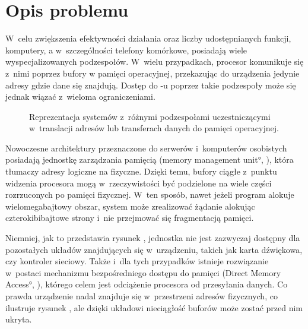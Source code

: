 \section{Opis problemu}

W~celu zwiększenia efektywności działania oraz liczby udostępnianych
funkcji, komputery, a w~szczególności telefony komórkowe, posiadają
wiele wyspecjalizowanych podzespołów.  W~wielu przypadkach, procesor
komunikuje się z~nimi poprzez bufory w pamięci operacyjnej,
przekazując do urządzenia jedynie adresy gdzie dane się znajdują.
Dostęp do -u poprzez takie podzespoły może się jednak wiązać
z~wieloma ograniczeniami.

\begin{figure}[tbp]
  \centering
   \qquad
  \qquad
  \caption[Różne przestrzenie adresowe dostępne
    w~komputerze.]{Reprezentacja systemów z~różnymi podzespołami
    uczestniczącymi w~translacji adresów lub transferach danych do
    pamięci operacyjnej.}
  \label{fig:mmu-iommu}
\end{figure}

Nowoczesne architektury przeznaczone do serwerów i~komputerów
osobistych posiadają jednostkę zarządzania pamięcią (\ang{memory
  management unit}, ), która tłumaczy adresy logiczne na
fizyczne.  Dzięki temu, bufory ciągłe z~punktu widzenia procesora mogą
w~rzeczywistości być podzielone na wiele części rozrzuconych po
pamięci fizycznej.  W~ten sposób, nawet jeżeli program alokuje
wielomegabajtowy obszar, system może zrealizować żądanie alokując
czterokibibajtowe strony i~nie przejmować się fragmentacją pamięci.

Niemniej, jak to przedstawia rysunek ,
jednostka  nie jest zazwyczaj dostępny dla pozostałych układów
znajdujących się w~urządzeniu, takich jak karta dźwiękowa, czy
kontroler sieciowy.  Także i~dla tych przypadków istnieje rozwiązanie
w~postaci mechanizmu bezpośredniego dostępu do pamięci (\ang{Direct
  Memory Access}, ), którego celem jest odciążenie procesora od
przesyłania danych.  Co prawda urządzenie nadal znajduje się
w~przestrzeni adresów fizycznych, co ilustruje rysunek
, ale dzięki układowi  nieciągłość
buforów może zostać przed nim ukryta.

